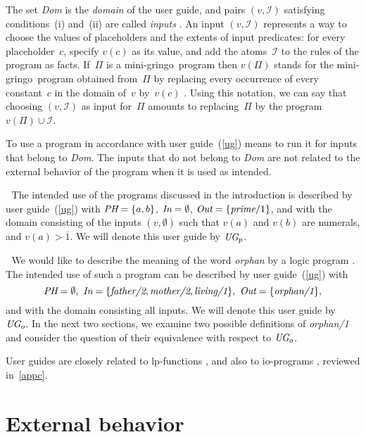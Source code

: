 \documentclass{tlp}
\def\gringo{{\sc gringo}}
\def\num{\overline}
\newcommand{\I}{\mathcal{I}}
\begin{document}
The set \emph{Dom} is the \emph{domain} of the user guide, and
pairs $(v,\I)$ satisfying conditions~(i) and~(ii) are called \emph{inputs}
\cite[Section~5.2]{fan20}.
An input $(v,\I)$ represents a way to choose the values of
placeholders and the extents of input predicates: for every
placeholder~$c$, specify $v(c)$ as its value, and add the atoms~$\I$
to the rules of the program as facts.  If~$\Pi$ is a mini-\gringo\ program
then $v(\Pi)$ stands for the mini-\gringo\ program obtained from~$\Pi$ by
replacing every occurrence of every constant~$c$ in the domain of~$v$
by~$v(c)$
\cite[Section~2.4]{fan22}.  Using this notation, we can say that
choosing $(v,\I)$ as input for~$\Pi$ amounts to
replacing~$\Pi$ by the program $v(\Pi)\cup\I$.

To use a program in accordance with user guide~(\ref{ug})
means to run it for inputs that belong to \emph{Dom}.  The
inputs that do not belong to \emph{Dom} are not related to the
external behavior of the program when it is used as intended.

\medskip{}$\;$ The intended use of the
programs discussed in the introduction is
described by user guide~(\ref{ug}) with
$\emph{PH} = \{a,b\}$, $\emph{In} = \emptyset$,
$\emph{Out} = \{\emph{prime}/1\}$,
and with the domain consisting of the inputs $(v,\emptyset)$ such that
$v(a)$ and $v(b)$ are numerals, and $v(a)>\num 1$.  We will denote this
user guide by $\emph{UG}_p$.

\medskip{}$\;$ We would like to describe the meaning
of the word \emph{orphan} by a logic program \cite[Section~4.1.2]{gel14}.
The intended use of such a
program can be described by user guide~(\ref{ug}) with
$$\emph{PH} = \emptyset,\
\emph{In} = \{\emph{father/2},\emph{mother/2}, \emph{living/1}\},\
\emph{Out} = \{\emph{orphan/1}\},$$
and with the domain consisting all inputs.    We will denote this
user guide by~$\emph{UG}_o$.  In the next two sections, we examine
two possible definitions of \hbox{\emph{orphan/1}}
and consider the question of their
equivalence with respect to $\emph{UG}_o$.
\medskip

User guides are closely related to lp-functions \cite[Section~2]{gel02},
and also to \hbox{io-programs} \cite[Section~5]{fan20}, reviewed
in~\ref{appc}.

\section{External behavior}
\end{document}
